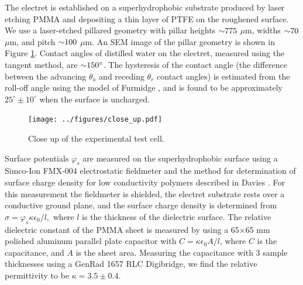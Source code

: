 \documentclass[aip,reprint, floatfix]{revtex4-1}
\begin{document}
The electret is established on a superhydrophobic substrate produced by laser etching PMMA and depositing a thin layer of PTFE on the roughened surface. We use a laser-etched pillared geometry with pillar heights $\sim \hspace{-1mm} 775$ $\mu$m, widths $\sim \hspace{-1mm} 70$ $\mu$m, and pitch $\sim \hspace{-1mm} 100$ $\mu$m. An SEM image of the pillar geometry is shown in Figure \ref{fig:SEM}. Contact angles of distilled water on the electret, measured using the tangent method, are $\sim \hspace{-1mm} 150^{\circ}$. The hysteresis of the contact angle (the difference between the advancing $\theta_a$ and receding $\theta_r$ contact angles) is estimated from the roll-off angle using the model of Furmidge \cite{furmidge_studies_1962}, and is found to be approximately $25^{\circ} \pm 10^{\circ}$ when the surface is uncharged.

\begin{figure}
    \centering
    \def\svgwidth{\columnwidth}
        \texttt{[image: ../figures/close\_up.pdf]}
    \caption{Close up of the experimental test cell.\label{fig:SEM}}
\end{figure}

Surface potentials $\varphi_s$ are measured on the superhydrophobic surface using a Simco-Ion FMX-004 electrostatic fieldmeter and the method for determination of surface charge density for low conductivity polymers described in Davies \cite{davies_examination_1967}. For this measurement the fieldmeter is shielded, the electret substrate rests over a conductive ground plane, and the surface charge density is determined from $\sigma = \varphi_s \kappa \epsilon_0/l,$ where $l$ is the thickness of the dielectric surface. The relative dielectric constant of the PMMA sheet is measured by using a 65$\times$65 mm polished aluminum parallel plate capacitor with $C = \kappa \epsilon_0 A/l$, where $C$ is the capacitance, and $A$ is the sheet area. Measuring the capacitance with 3 sample thicknesses using a GenRad 1657 RLC Digibridge, we find the relative permittivity to be $\kappa = 3.5 \pm 0.4$.  
\end{document}
